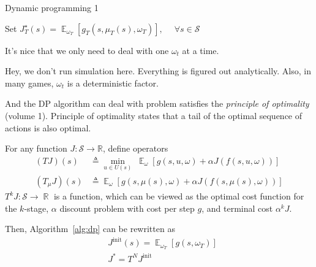 \documentclass[11pt,a4paper]{article}
\begin{document}
\begin{algorithm}[H]
    \label{alg:dp}
    \DontPrintSemicolon
    \caption{Dynamic programming 1}
    \SetAlgoLined
    
    \BlankLine
    \BlankLine
    Set $J^{\star }_T(s) = \mathop{\mathbb{E}}_{\omega_T} \left[  g_T(s, \mu_{T}(s), \omega_T) \right], \quad \; \forall s \in \mathcal{S}$ \;
\end{algorithm}
{\blue It's nice that we only need to deal with one $\omega_t$ at a time.}
\begin{remark}
    Hey, we don't run simulation here. Everything is figured out analytically. Also, in many games, $\omega_t$ is a deterministic factor.
\end{remark}
\begin{remark}
    And the DP algorithm can deal with problem satisfies the \textit{principle of optimality} (volume 1). Principle of optimality states that a tail of the optimal sequence of actions is also optimal.
\end{remark}
For any function $J: \mathcal{S} \rightarrow \mathbb{R}$, define operators
\begin{align*}
    (T J) (s) &\triangleq \min_{u \in U(s)}\; \mathop{\mathbb{E}}_{\omega} 
    \left[ g(s, u, \omega) + \alpha J(f(s, u, \omega)) \right] \\
    (T_{\mu} J) (s) &\triangleq \mathop{\mathbb{E}}_{\omega} \left[ g(s, \mu(s), \omega) + \alpha J(f(s, \mu(s), \omega)) \right]
\end{align*} 
{\blue $T^{k}J: \mathcal{S} \rightarrow \mathop{\mathbb{R}}$ is a function, which can be viewed as the optimal cost function for the $k$-stage, $\alpha$ discount problem with cost per step $g$, and terminal cost $\alpha ^{k}J$.}

Then, Algorithm~\ref{alg:dp} can be rewritten as
\begin{align*}
&J^{\text{init}}(s) = \mathop{\mathbb{E}}_{\omega_T} [g(s, \omega_T)] \\
&J^{* } = T^{N} J^{\text{init}} 
\end{align*}
\end{document}
